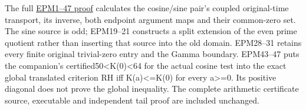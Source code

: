 \documentclass[
  10pt,
  a4paper,
]{article}
\begin{document}
The full \href{ENDPOINT_PAIR_TRANSPORT_AND_WEIL_MATRIX.md}{EPM1--47
proof} calculates the cosine/sine pair's coupled original-time
transport, its inverse, both endpoint argument maps and their
common-zero set. The sine source is odd; EPM19--21 constructs a split
extension of the even prime quotient rather than inserting that source
into the old domain. EPM28--31 retains every finite original
trivial-zero entry and the Gamma boundary. EPM43--47 puts the
companion's certified50\textless K(0)\textless64 for the actual cosine
test into the exact global translated criterion RH iff
\textbar K(a)\textbar\textless=K(0) for every a\textgreater=0. Its
positive diagonal does not prove the global inequality. The complete
arithmetic certificate source, executable and independent tail proof are
included unchanged.
\end{document}
